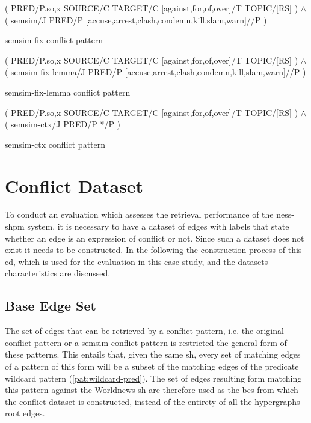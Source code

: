 \documentclass[11pt]{scrreprt}
\begin{document}
{\begin{pattern}[H]
  \normalfont\sffamily
  \centering
  ( PRED/P.{so,x} SOURCE/C TARGET/C [against,for,of,over]/T TOPIC/[RS] ) \(\wedge\)\\ 
  ( semsim/J PRED/P [accuse,arrest,clash,condemn,kill,slam,warn]//P )
  \caption{semsim-fix conflict pattern}
  \label{pat:semsim-fix-conflict}
\end{pattern}

\begin{pattern}[H]
  \normalfont\sffamily
  \centering
  ( PRED/P.{so,x} SOURCE/C TARGET/C [against,for,of,over]/T TOPIC/[RS] ) \(\wedge\)\\ 
  ( semsim-fix-lemma/J PRED/P [accuse,arrest,clash,condemn,kill,slam,warn]//P )
  \caption{semsim-fix-lemma conflict pattern}
  \label{pat:semsim-fix-lemma-conflict}
\end{pattern}

\begin{pattern}[H]
  \normalfont\sffamily
  \centering
  ( PRED/P.{so,x} SOURCE/C TARGET/C [against,for,of,over]/T TOPIC/[RS] ) \(\wedge\)\\ 
  ( semsim-ctx/J PRED/P */P )
  \caption{semsim-ctx conflict pattern}
  \label{pat:semsim-ctx-conflict}
\end{pattern}



\section{Conflict Dataset}
\label{sec:conflict-dataset}
To conduct an evaluation which assesses the retrieval performance of the \gls{ness-shpm} system, it is necessary to have a dataset of edges with labels that state whether an edge is an expression of conflict or not. Since such a dataset does not exist it needs to be constructed. In the following the construction process of this \gls{cd}, which is used for the evaluation in this case study, and the datasets characteristics are discussed.

\subsection{Base Edge Set}
\label{sec:base-edge-set}
The set of edges that can be retrieved by a conflict pattern, i.e. the original conflict pattern or a semsim conflict pattern is restricted the general form of these patterns. This entails that, given the same \gls{sh}, every set of matching edges of a pattern of this form will be a subset of the matching edges of the predicate wildcard pattern (\cref{pat:wildcard-pred}). The set of edges resulting form matching this pattern against the Worldnews-\gls{sh} are therefore used as the \gls{bes} from which the conflict dataset is constructed, instead of the entirety of all the hypergraphs root edges.

}
\end{document}
